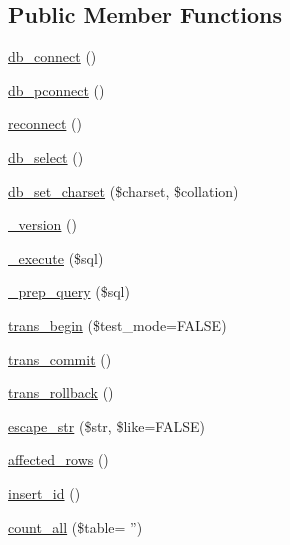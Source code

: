 \subsection*{Public Member Functions}
\begin{DoxyCompactItemize}
\item 
\hyperlink{class_c_i___d_b__sqlite__driver_a6aa545dcb7768f0b62d37cdcf7f09adc}{db\-\_\-connect} ()
\item 
\hyperlink{class_c_i___d_b__sqlite__driver_a0f69e662bd02de5bcf98647068e7c653}{db\-\_\-pconnect} ()
\item 
\hyperlink{class_c_i___d_b__sqlite__driver_a57c19c642ab3023e28d10c50f86ff0a8}{reconnect} ()
\item 
\hyperlink{class_c_i___d_b__sqlite__driver_af0c7f2602586ea2050b19fb36baefb24}{db\-\_\-select} ()
\item 
\hyperlink{class_c_i___d_b__sqlite__driver_adc8cd12121dc8edda3adcadd88a97e24}{db\-\_\-set\-\_\-charset} (\$charset, \$collation)
\item 
\hyperlink{class_c_i___d_b__sqlite__driver_ac997a462bb342f97f414910f0e033fb6}{\-\_\-version} ()
\item 
\hyperlink{class_c_i___d_b__sqlite__driver_a114ab675d89bf8324a41785fb475e86d}{\-\_\-execute} (\$sql)
\item 
\hyperlink{class_c_i___d_b__sqlite__driver_a86af88ef0fa6d44ab4691e3f53270339}{\-\_\-prep\-\_\-query} (\$sql)
\item 
\hyperlink{class_c_i___d_b__sqlite__driver_a90e153cf190d273336d77cce930587e1}{trans\-\_\-begin} (\$test\-\_\-mode=F\-A\-L\-S\-E)
\item 
\hyperlink{class_c_i___d_b__sqlite__driver_af4fbdcdace4aa94a139b64877601fe9b}{trans\-\_\-commit} ()
\item 
\hyperlink{class_c_i___d_b__sqlite__driver_a53f76d4dfcd6ac04fb653982442aeef8}{trans\-\_\-rollback} ()
\item 
\hyperlink{class_c_i___d_b__sqlite__driver_aaba16891c8c93600a87075800cc5b72b}{escape\-\_\-str} (\$str, \$like=F\-A\-L\-S\-E)
\item 
\hyperlink{class_c_i___d_b__sqlite__driver_a77248aaad33eb132c04cc4aa3f4bc8cb}{affected\-\_\-rows} ()
\item 
\hyperlink{class_c_i___d_b__sqlite__driver_a933f2cde8dc7f87875e257d0a4902e99}{insert\-\_\-id} ()
\item 
\hyperlink{class_c_i___d_b__sqlite__driver_a66111c61856499b091af32502978d4fc}{count\-\_\-all} (\$table= '')
\item 

\end{DoxyCompactItemize}
